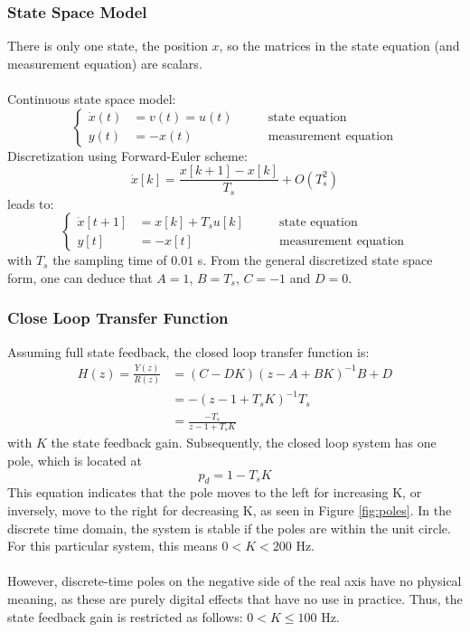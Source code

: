 \documentclass[a4paper,kul]{kulakarticle} %
\begin{document}
\subsubsection*{State Space Model}
There is only one state, the position $x$, so the matrices in the state equation (and measurement equation) are scalars. 
\\\\
Continuous state space model:
\begin{equation}
\left\{
	\begin{split}
	\dot{x}(t) &= v(t) = u(t) \qquad &\text{state equation} \\
	y(t) &= -x(t) &\text{measurement equation}
	\end{split}
	\right.
\end{equation}
Discretization using Forward-Euler scheme:
\begin{equation}
	\dot{x}[k] = \frac{x[k+1] - x[k]}{T_s} + O(T_s^2)
\end{equation}
leads to:
\begin{equation}
\left\{
\begin{split}
\dot{x}[t+1] &= x[k] + T_s u[k] \qquad &\text{state equation} \\
y[t] &= -x[t] &\text{measurement equation}
\end{split}
\right.
\end{equation}
with $T_s$ the sampling time of $0.01$ s. From the general discretized state space form, one can deduce that $A = 1$, $B = T_s$, $C = -1$ and $D = 0$.

\subsubsection*{Close Loop Transfer Function}
Assuming full state feedback, the closed loop transfer function is:
\begin{equation}
	\begin{split}
	H(z) = \frac{Y(z)}{R(z)} &= (C-DK)(z - A + BK)^{-1}B + D \\
	&= -(z-1 + T_s K)^{-1} T_s \\
	&= \frac{-T_s}{z-1+T_sK}
	\end{split}
\end{equation}
with $K$ the state feedback gain. Subsequently, the closed loop system has one pole, which is located at
\begin{equation}
	p_d = 1 - T_s K
\end{equation}
This equation indicates that the pole moves to the left for increasing K, or inversely, move to the right for decreasing K, as seen in Figure \ref{fig:poles}. In the discrete time domain, the system is stable if the poles are within the unit circle. For this particular system, this means $0 < K < 200$ Hz. 
\\\\
However, discrete-time poles on the negative side of the real axis have no physical meaning, as these are purely digital effects that have no use in practice. Thus, the state feedback gain is restricted as follows: $0 < K \le 100$ Hz.
\end{document}
